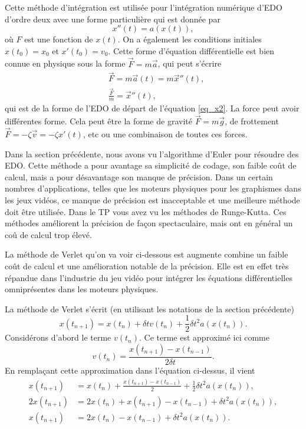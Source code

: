 \documentclass[a4paper,12pt]{book}
\begin{document}
Cette méthode d'intégration est utilisée pour l'intégration numérique d'EDO d'ordre 
deux avec une forme particulière qui est donnée par
\begin{equation}
 x''(t)=a(x(t)),\label{eq_x2}
\end{equation}
où $F$ est une fonction de $x(t)$. On a également les conditions initiales
$x(t_0)=x_0$ et $x'(t_0)=v_0$. Cette forme d'équation différentielle
est bien connue en physique sous la forme $\vec F=m\vec a$, qui peut s'écrire
\begin{align}
 &\vec{F}=m \vec a(t)=m \vec x''(t),\nonumber\\
 &\frac{\vec{F}}{m}= \vec x''(t),
\end{align}
qui est de la forme de l'EDO de départ de l'équation \eqref{eq_x2}. La force peut 
avoir différentes forme. Cela peut être la forme de gravité $\vec F=m \vec g$, de 
frottement $\vec F=-\zeta \vec v=-\zeta x'(t)$, etc ou une combinaison de toutes ces forces.

Dans la section précédente, nous avons vu l'algorithme d'Euler pour résoudre des EDO. 
Cette méthode a pour avantage sa simplicité de codage, son faible coût de calcul, mais 
a pour désavantage son manque de précision. Dans un certain nombres d'applications, telles 
que les moteurs physiques pour les graphismes dans les jeux vidéos, ce manque de précision 
est inacceptable et une meilleure méthode doit être utilisée. Dans le TP vous avez vu les 
méthodes de Runge-Kutta. Ces méthodes améliorent la précision de façon spectaculaire, mais
ont en général un coû de calcul trop élevé.

La méthode de Verlet qu'on va voir ci-dessous est augmente combine un faible coût de calcul
et une amélioration notable de la précision. Elle est en effet très répandue dans l'industrie du jeu vidéo pour intégrer les équations différentielles omniprésentes dans les moteurs physiques.

La méthode de Verlet s'écrit (en utilisant les notations de la section précédente) 
\begin{equation}
 x(t_{n+1})=x(t_n)+\delta t v(t_n)+\frac{1}{2}\delta t^2 a(x(t_n)).\label{eq_verlet_gen}
\end{equation}
Considérons d'abord le terme $v(t_n)$. Ce terme est approximé ici comme
\begin{equation}
 v(t_n) = \frac{x(t_{n+1})-x(t_{n-1})}{2\delta t}.
\end{equation}
En remplaçant cette approximation dans l'équation ci-dessus, il vient
\begin{align}
 x(t_{n+1})&=x(t_n)+\frac{x(t_{n+1})-x(t_{n-1})}{2}+\frac{1}{2}\delta t^2 a(x(t_n)),\nonumber\\
 2x(t_{n+1})&=2x(t_n)+x(t_{n+1})-x(t_{n-1})+\delta t^2 a(x(t_n)),\nonumber\\
 x(t_{n+1})&=2x(t_n)-x(t_{n-1})+\delta t^2 a(x(t_n)).\label{eq_verlet_novel}
\end{align}
\end{document}
